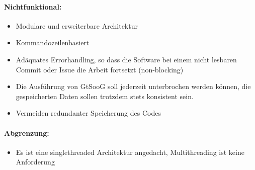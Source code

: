 \documentclass[10pt, a4paper]{article}
\begin{document}
\paragraph{Nichtfunktional:}
\begin{itemize}
	\item Modulare und erweiterbare Architektur
	\item Kommandozeilenbasiert
	\item Adäquates Errorhandling, so dass die Software bei einem nicht lesbaren Commit oder Issue die Arbeit fortsetzt (non-blocking)
	\item Die Ausführung von GtSooG soll jederzeit unterbrochen werden können, die gespeicherten Daten sollen trotzdem stets konsistent sein.
	\item Vermeiden redundanter Speicherung des Codes
\end{itemize} 

\paragraph{Abgrenzung:}
\begin{itemize}
	\item Es ist eine singlethreaded Architektur angedacht, Multithreading ist keine Anforderung
\end{itemize}
\end{document}
